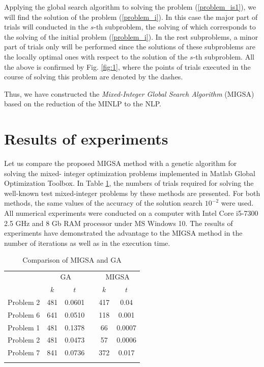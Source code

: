 \documentclass{llncs}
\begin{document}
Applying the global search algorithm to solving the problem (\ref{problem_is1}), we will find 
the solution of the problem (\ref{problem_i}). In this case the major part of trials will conducted in 
the $s$-th subproblem, the solving of which corresponds to the solving of the initial 
problem (\ref{problem_i}). In the rest subproblems, a minor part of trials only will be performed 
since the solutions of these subproblems are the locally optimal ones with respect to the solution 
of the $s$-th subproblem. All the above is confirmed by Fig. \ref{fig:1}, where the 
points of trials executed in the course of solving this problem are denoted by the dashes.


Thus,  we have constructed the \textit{Mixed-Integer Global Search Algorithm} (MIGSA) based on the  
reduction of the MINLP to the NLP. 

\section{Results of experiments}

Let us compare the proposed MIGSA method with a genetic algorithm for solving the mixed-
integer optimization problems implemented in Matlab Global Optimization Toolbox. In Table 
\ref{tab:1}, the numbers of trials required for solving the well-known test mixed-integer 
problems by these methods are presented. For both methods, the same values of the accuracy of 
the solution search $10^{-2}$ were used. All numerical experiments were conducted on a 
computer with Intel Core i5-7300 2.5 GHz and 8 Gb RAM processor under MS Windows 10. The 
results of experiments have demonstrated the advantage to the MIGSA method in the number 
of iterations as well as in the execution time.

\begin{table}
	\caption{Comparison of MIGSA and GA}
	\label{tab:1}
	\center
	\begin{tabular}{cccccc}
		\hline\noalign{\smallskip}
	\multirow{2}{*}{Test problem}	 & \multicolumn{2}{c}{ GA } & & \multicolumn{2}{c}{MIGSA} \\
		\noalign{\smallskip} \cline{2-3} \cline{5-6} \noalign{\smallskip}
		 & $k$ & $t$ & & $k$ & $t$  \\
		\noalign{\smallskip} \hline \noalign{\smallskip}
		 Problem 2 \cite{Floudas}&	481 &	0.0601 & &	417 &	0.04 \\
		 Problem 6 \cite{Floudas}&	641 &	0.0510 & &	118 &	0.001 \\
		 Problem 1 \cite{Deep}   &	481 &	0.1378 & &	66 &	0.0007 \\
		 Problem 2 \cite{Deep}   &	481 &	0.0473 & &	57 &	0.0006 \\
		 Problem 7 \cite{Deep}   &	841 &	0.0736 & & 372	 &	0.017 \\
		\noalign{\smallskip}\hline
	\end{tabular}
\end{table}
\end{document}
